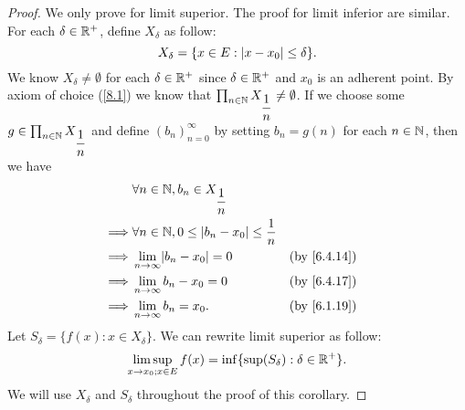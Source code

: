 \begin{proof}
  We only prove for limit superior.
  The proof for limit inferior are similar.
  For each \(\delta \in \mathbb{R}^+\), define \(X_{\delta}\) as follow:
  \[
    X_{\delta} = \{x \in E : \left\lvert x - x_0\right\rvert \leq \delta\}.
  \]
  We know \(X_{\delta} \neq \emptyset\) for each \(\delta \in \mathbb{R}^+\) since \(\delta \in \mathbb{R}^+\) and \(x_0\) is an adherent point.
  By axiom of choice (\cref{8.1}) we know that \(\prod_{n \in \mathbb{N}} X_{\dfrac{1}{n}} \neq \emptyset\).
  If we choose some \(g \in \prod_{n \in \mathbb{N}} X_{\dfrac{1}{n}}\) and define \((b_n)_{n = 0}^\infty\) by setting \(b_n = g(n)\) for each \(n \in \mathbb{N}\), then we have
  \begin{align*}
             & \forall n \in \N, b_n \in X_{\dfrac{1}{n}}                                  \\
    \implies & \forall n \in \N, 0 \leq \abs{b_n - x_0} \leq \dfrac{1}{n}                  \\
    \implies & \lim_{n \to \infty} \abs{b_n - x_0} = 0                    &  & \by{6.4.14} \\
    \implies & \lim_{n \to \infty} b_n - x_0 = 0                          &  & \by{6.4.17} \\
    \implies & \lim_{n \to \infty} b_n = x_0.                             &  & \by{6.1.19}
  \end{align*}
  Let \(S_{\delta} = \{f(x) : x \in X_{\delta}\}\).
  We can rewrite limit superior as follow:
  \[
    \limsup_{x \to x_0 ; x \in E} f(x) = \inf\{\sup(S_\delta) : \delta \in \mathbb{R}^+\}.
  \]
  We will use \(X_{\delta}\) and \(S_{\delta}\) throughout the proof of this corollary.


\end{proof}
